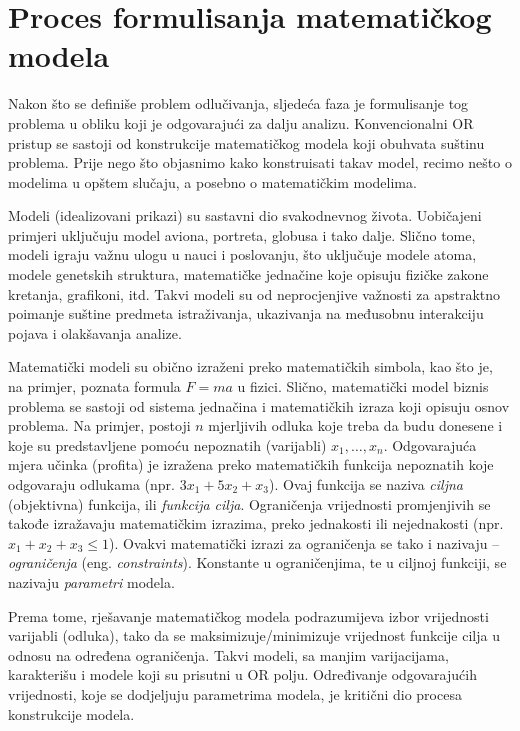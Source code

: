 \documentclass[a4paper, utf8, 11pt, colorlinks]{book}
\begin{document}
\section{Proces formulisanja matematičkog modela}

Nakon što se definiše problem odlučivanja, sljedeća faza je formulisanje tog problema u obliku koji je odgovarajući za dalju analizu. Konvencionalni OR pristup se sastoji od konstrukcije matematičkog modela koji obuhvata suštinu problema. Prije nego što objasnimo kako konstruisati takav model, recimo nešto o modelima u opštem slučaju, a posebno o matematičkim modelima.

Modeli (idealizovani prikazi) su sastavni dio svakodnevnog života. Uobičajeni 
primjeri uključuju model aviona, portreta, globusa i tako dalje. Slično tome, modeli igraju
važnu ulogu u nauci i poslovanju, što uključuje modele atoma, modele 
genetskih struktura, matematičke jednačine koje opisuju fizičke zakone kretanja, grafikoni, itd. Takvi modeli
su od neprocjenjive važnosti za apstraktno poimanje suštine predmeta istraživanja, ukazivanja na međusobnu interakciju pojava i olakšavanja analize. 

Matematički modeli su obično izraženi preko matematičkih simbola, kao što je, na primjer, poznata formula $F=ma$ u fizici. Slično, matematički model biznis problema   
se sastoji od sistema jednačina i matematičkih izraza koji opisuju osnov problema. Na primjer, postoji $n$ mjerljivih odluka koje treba da budu donesene i koje su predstavljene pomoću nepoznatih (varijabli) $x_1,\ldots, x_n$.  Odgovarajuća mjera učinka (profita) je izražena preko matematičkih funkcija nepoznatih koje odgovaraju  odlukama (npr. $3x_1 + 5x_2 + x_3$). Ovaj funkcija se naziva \emph{ciljna} (objektivna) funkcija, ili \emph{funkcija cilja}. Ograničenja  vrijednosti promjenjivih se takođe izražavaju matematičkim izrazima, preko jednakosti ili nejednakosti (npr. $x_1 + x_2 + x_3 \leq 1$).  Ovakvi matematički izrazi za ograničenja se tako i nazivaju -- \emph{ograničenja} (eng. \emph{constraints}). Konstante u ograničenjima, te u ciljnoj funkciji, se nazivaju \emph{parametri} modela.

Prema tome, rješavanje matematičkog modela 
podrazumijeva izbor vrijednosti varijabli (odluka), tako da se maksimizuje/minimizuje vrijednost funkcije cilja u odnosu na određena ograničenja. Takvi modeli, sa manjim varijacijama, karakterišu i modele koji su prisutni u OR polju. 
Određivanje odgovarajućih vrijednosti, koje se dodjeljuju parametrima modela, je kritični dio procesa konstrukcije modela.
\end{document}
